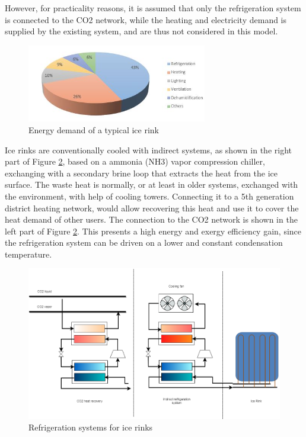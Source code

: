 \documentclass{article}
\begin{document}
However, for practicality reasons, it is assumed that only the refrigeration system is connected to the CO2 network, while the heating and electricity demand is supplied by the existing system, and are thus not considered in this model.

\begin{figure}[htp]
	\centering
	\includegraphics[width=0.7\textwidth]{IR_energyDemand.JPG}
	\caption{Energy demand of a typical ice rink \cite{karampourMEASUREMENTMODELLINGICE}}
	\label{fig:IR_energyDemand}
\end{figure}

Ice rinks are conventionally cooled with indirect systems, as shown in the right part of Figure \ref{fig:IR_refSystem}, based on a ammonia (NH3) vapor compression chiller, exchanging with a secondary brine loop that extracts the heat from the ice surface. The waste heat is normally, or at least in older systems, exchanged with the environment, with help of cooling towers. Connecting it to a 5th generation district heating network, would allow recovering this heat and use it to cover the heat demand of other users. The connection to the CO2 network is shown in the left part of Figure \ref{fig:IR_refSystem}. This presents a high energy and exergy efficiency gain, since the refrigeration system can be driven on a lower and constant condensation temperature.\\

\begin{figure}[htp]
	\centering
	\includegraphics[width=1\textwidth]{IceRink_refrigeration.png}
	\caption{Refrigeration systems for ice rinks}
	\label{fig:IR_refSystem}
\end{figure}
\end{document}
